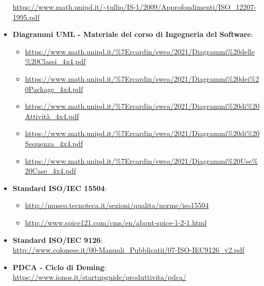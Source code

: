 \begin{itemize}
	\url{https://www.math.unipd.it/~tullio/IS-1/2009/Approfondimenti/ISO_12207-1995.pdf}
	\item \textbf{Diagrammi UML - Materiale del corso di Ingegneria del Software}:
	\begin{itemize}
		\item \url {https://www.math.unipd.it/%7Ercardin/swea/2021/Diagrammi%20delle%20Classi_4x4.pdf}
		\item \url {https://www.math.unipd.it/%7Ercardin/swea/2021/Diagrammi%20dei%20Package_4x4.pdf}
		\item \url {https://www.math.unipd.it/%7Ercardin/swea/2021/Diagrammi%20di%20Attività_4x4.pdf}
		\item \url {https://www.math.unipd.it/%7Ercardin/swea/2021/Diagrammi%20di%20Sequenza_4x4.pdf}
		\item \url{https://www.math.unipd.it/%7Ercardin/swea/2021/Diagrammi%20Use%20Case_4x4.pdf}		
	\end{itemize}
	\item \textbf{Standard ISO/IEC 15504}: 
	\begin{itemize}
			\item \url{http://museo.tecnoteca.it/sezioni/qualita/norme/iso15504}
			\item \url{http://www.spice121.com/cms/en/about-spice-1-2-1.html}
	\end{itemize}
	\item \textbf{Standard ISO/IEC 9126}:\\
	\url{http://www.colonese.it/00-Manuali_Pubblicatii/07-ISO-IEC9126_v2.pdf}
	\item \textbf{PDCA - Ciclo di Deming}:\\
	\url{https://www.ionos.it/startupguide/produttivita/pdca/}
\end{itemize}